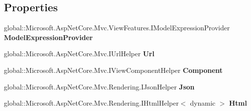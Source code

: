 \subsection*{Properties}
\begin{DoxyCompactItemize}
\item 
\mbox{\label{class_projeto_e_s_w_1_1_areas_1_1_identity_1_1_pages_1_1_areas___identity___pages_____view_imports_a31b46bd568912cef1a84af0f1e3a3d63}} 
global\+::\+Microsoft.\+Asp\+Net\+Core.\+Mvc.\+View\+Features.\+I\+Model\+Expression\+Provider {\bfseries Model\+Expression\+Provider}
\item 
\mbox{\label{class_projeto_e_s_w_1_1_areas_1_1_identity_1_1_pages_1_1_areas___identity___pages_____view_imports_ac80e86ab85d9fe65b63a6b92ccdd4222}} 
global\+::\+Microsoft.\+Asp\+Net\+Core.\+Mvc.\+I\+Url\+Helper {\bfseries Url}
\item 
\mbox{\label{class_projeto_e_s_w_1_1_areas_1_1_identity_1_1_pages_1_1_areas___identity___pages_____view_imports_a461c3fa43bafaa94c096a119a27cc8d8}} 
global\+::\+Microsoft.\+Asp\+Net\+Core.\+Mvc.\+I\+View\+Component\+Helper {\bfseries Component}
\item 
\mbox{\label{class_projeto_e_s_w_1_1_areas_1_1_identity_1_1_pages_1_1_areas___identity___pages_____view_imports_abdec22ec8163ac34f3d0edb59501550c}} 
global\+::\+Microsoft.\+Asp\+Net\+Core.\+Mvc.\+Rendering.\+I\+Json\+Helper {\bfseries Json}
\item 
\mbox{\label{class_projeto_e_s_w_1_1_areas_1_1_identity_1_1_pages_1_1_areas___identity___pages_____view_imports_a0e77dc5ddac44c273bd876e983eae277}} 
global\+::\+Microsoft.\+Asp\+Net\+Core.\+Mvc.\+Rendering.\+I\+Html\+Helper$<$ dynamic $>$ {\bfseries Html}
\end{DoxyCompactItemize}


